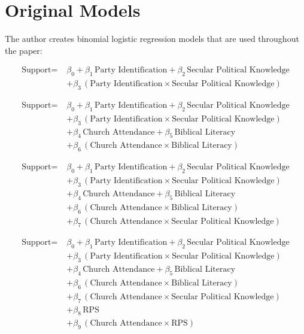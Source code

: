 \documentclass[12pt,letterpaper]{article}
\begin{document}
\section{Original Models}
\begin{description}
	\item The author creates binomial logistic regression models that are used throughout the paper:
	\item[Secular Model:]
\begin{align*}
	\text{Support} =\;& \beta_0 
	+ \beta_1 \, \text{Party Identification} 
	+ \beta_2 \, \text{Secular Political Knowledge} \\
	& + \beta_3 \, (\text{Party Identification} \times \text{Secular Political Knowledge}) 
\end{align*}
\item[Naive Model:]
\begin{align*}
	\text{Support} =\;& \beta_0 
	+ \beta_1 \, \text{Party Identification} 
	+ \beta_2 \, \text{Secular Political Knowledge} \\
	& + \beta_3 \, (\text{Party Identification} \times \text{Secular Political Knowledge}) \\
	& + \beta_4 \, \text{Church Attendance} 
	+ \beta_5 \, \text{Biblical Literacy} \\
	& + \beta_6 \, (\text{Church Attendance} \times \text{Biblical Literacy}) 
\end{align*}
\item["Culture Wars" Model:]
\begin{align*}
	\text{Support} =\;& \beta_0 
	+ \beta_1 \, \text{Party Identification} 
	+ \beta_2 \, \text{Secular Political Knowledge} \\
	& + \beta_3 \, (\text{Party Identification} \times \text{Secular Political Knowledge}) \\
	& + \beta_4 \, \text{Church Attendance} 
	+ \beta_5 \, \text{Biblical Literacy} \\
	& + \beta_6 \, (\text{Church Attendance} \times \text{Biblical Literacy}) \\
	& + \beta_7 \, (\text{Church Attendance} \times \text{Secular Political Knowledge}) 
\end{align*}
\item[RPS Model:]
\begin{align*}
	\text{Support} =\;& \beta_0 
	+ \beta_1 \, \text{Party Identification} 
	+ \beta_2 \, \text{Secular Political Knowledge} \\
	& + \beta_3 \, (\text{Party Identification} \times \text{Secular Political Knowledge}) \\
	& + \beta_4 \, \text{Church Attendance} 
	+ \beta_5 \, \text{Biblical Literacy} \\
	& + \beta_6 \, (\text{Church Attendance} \times \text{Biblical Literacy}) \\
	& + \beta_7 \, (\text{Church Attendance} \times \text{Secular Political Knowledge}) \\
	& + \beta_8 \, \text{RPS} \\
	& + \beta_9 \, (\text{Church Attendance} \times \text{RPS}) 
\end{align*}

\end{description}
\end{document}
